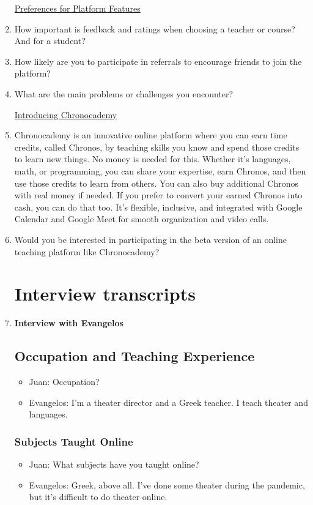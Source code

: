 \begin{enumerate}
\underline{Preferences for Platform Features}
\item How important is feedback and ratings when choosing a teacher or course?
And for a student?
\item How likely are you to participate in referrals to encourage friends to join the platform?
\item What are the main problems or challenges you encounter?

\underline{Introducing Chronocademy}
\item Chronocademy is an innovative online platform where you can earn time credits, called Chronos, by teaching skills you know and spend those credits to learn new things.
No money is needed for this.
Whether it's languages, math, or programming, you can share your expertise, earn Chronos, and then use those credits to learn from others.
You can also buy additional Chronos with real money if needed.
If you prefer to convert your earned Chronos into cash, you can do that too.
It's flexible, inclusive, and integrated with Google Calendar and Google Meet for smooth organization and video calls.

\item Would you be interested in participating in the beta version of an online teaching platform like Chronocademy?

\section{Interview transcripts}\label{sec:interview-transcripts}

\item \textbf{Interview with Evangelos}

\subsection*{Occupation and Teaching Experience}
\begin{itemize}
\item Juan: Occupation?
\item Evangelos: I'm a theater director and a Greek teacher.
I teach theater and languages.
\end{itemize}

\subsubsection*{Subjects Taught Online}
\begin{itemize}
\item Juan: What subjects have you taught online?
\item Evangelos: Greek, above all.
I’ve done some theater during the pandemic, but it’s difficult to do theater online.
\end{itemize}


\end{enumerate}
